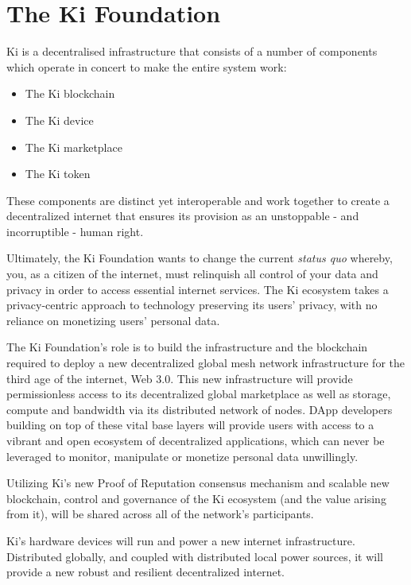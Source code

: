 \section{The Ki Foundation}
\label{sec:kifoundation}
Ki is a decentralised infrastructure that consists of a number of components which operate in concert to make the entire system work:

\begin{itemize}
    \item The Ki blockchain
    \item The Ki device
    \item The Ki marketplace
    \item The Ki token
    \end{itemize}
    
These components are distinct yet interoperable and work together to create a decentralized internet that ensures its provision as an unstoppable - and incorruptible - human right. 

Ultimately, the Ki Foundation wants to change the current \textit{status quo} whereby, you, as a citizen of the internet, must relinquish all control of your data and privacy in order to access essential internet services. The Ki ecosystem takes a privacy-centric approach to technology preserving its users' privacy, with no reliance on monetizing users' personal data. 

The Ki Foundation’s role is to build the infrastructure and the blockchain required to deploy a new decentralized global mesh network infrastructure for the third age of the internet, Web 3.0. This new infrastructure will provide permissionless access to its decentralized global marketplace as well as storage, compute and bandwidth via its distributed network of nodes. DApp developers building on top of these vital base layers will provide users with access to a vibrant and open ecosystem of decentralized applications, which can never be leveraged to monitor, manipulate or monetize personal data unwillingly.


Utilizing Ki's new Proof of Reputation consensus mechanism and scalable new blockchain, control and governance of the Ki ecosystem (and the value arising from it), will be shared across all of the network's participants. 

Ki's hardware devices will run and power a new internet infrastructure. Distributed globally, and coupled with distributed local power sources, it will provide a new robust and resilient decentralized internet. 

